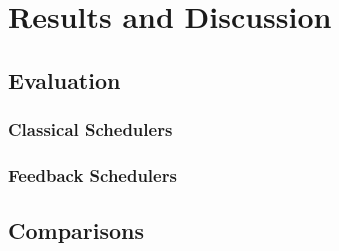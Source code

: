\chapter{Results and Discussion}
%
\label{chap:results}




\section{Evaluation}\label{sec:results-evaluation}



\subsection{Classical Schedulers}\label{sec:results-evaluation-classical}

\subsection{Feedback Schedulers}\label{sec:results-evaluation-feedback}


\section{Comparisons}\label{sec:results-comparisons}


